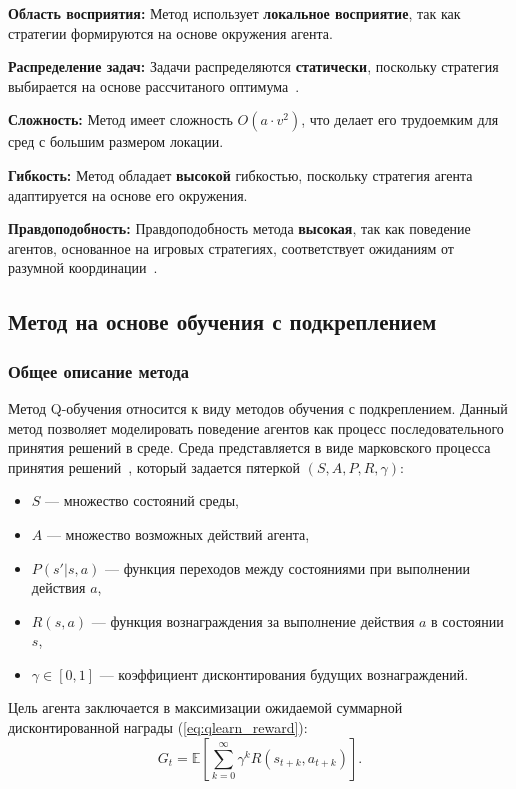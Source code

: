 \textbf{Область восприятия:}  
Метод использует \textbf{локальное восприятие}, так как стратегии формируются на основе окружения агента.

\textbf{Распределение задач:}  
Задачи распределяются \textbf{статически}, поскольку стратегия выбирается на основе рассчитаного оптимума~\cite{gametheory-applcation}.

\textbf{Сложность:}  
Метод имеет сложность $O(a \cdot v^2)$, что делает его трудоемким для сред с большим размером локации.

\textbf{Гибкость:}  
Метод обладает \textbf{высокой} гибкостью, поскольку стратегия агента адаптируется на основе его окружения.

\textbf{Правдоподобность:}  
Правдоподобность метода \textbf{высокая}, так как поведение агентов, основанное на игровых стратегиях, соответствует ожиданиям от разумной координации~\cite{gametheory-applcation}.

\subsection{Метод на основе обучения с подкреплением}

\subsubsection*{Общее описание метода}
Метод Q-обучения относится к виду методов обучения с подкреплением.
Данный метод позволяет моделировать поведение агентов как процесс последовательного принятия решений в среде.
Среда представляется в виде марковского процесса принятия решений~\cite{markov-decision-process}, который задается пятеркой $(S, A, P, R, \gamma)$:
\begin{itemize}[leftmargin=1.6\parindent]
	\item $S$ — множество состояний среды,
	\item $A$ — множество возможных действий агента,
	\item $P(s' | s, a)$ — функция переходов между состояниями при выполнении действия $a$,
	\item $R(s, a)$ — функция вознаграждения за выполнение действия $a$ в состоянии $s$,
	\item $\gamma \in [0, 1]$ — коэффициент дисконтирования будущих вознаграждений.
\end{itemize}

Цель агента заключается в максимизации ожидаемой суммарной дисконтированной награды (\ref{eq:qlearn_reward}):
\begin{equation}
	\label{eq:qlearn_reward}
	G_t = \mathbb{E} \left[ \sum_{k=0}^{\infty} \gamma^k R(s_{t+k}, a_{t+k}) \right].
\end{equation}

